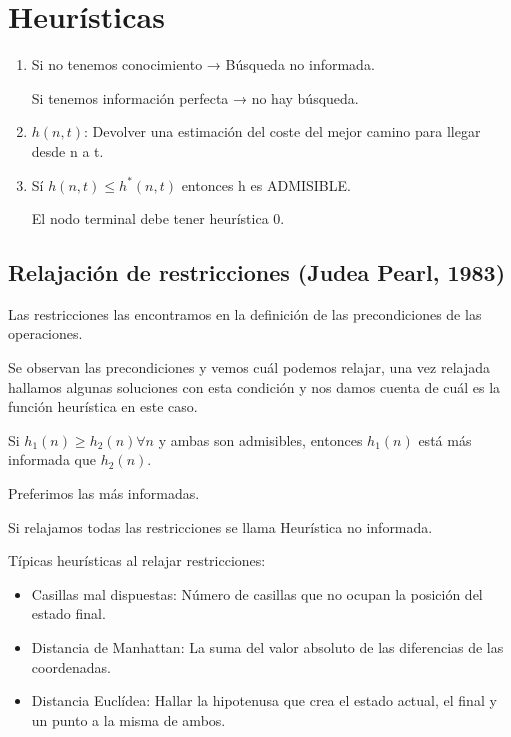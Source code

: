 \documentclass[12pt, twoside, openright]{report} %
\begin{document}
	
\section{Heurísticas}

  \begin{enumerate}
  \def\labelenumi{\arabic{enumi}.}
  \item
    Si no tenemos conocimiento → Búsqueda no informada.

    Si tenemos información perfecta → no hay búsqueda.
  \item
    \(h(n,t)\): Devolver una estimación del coste del mejor camino para
    llegar desde n a t.
  \item
    Sí \(h(n,t) \leq h^*(n,t)\) entonces h es ADMISIBLE.

    El nodo terminal debe tener heurística 0.
  \end{enumerate}

\subsection{Relajación de restricciones (Judea Pearl, 1983)}



    Las restricciones las encontramos en la definición de las
    precondiciones de las operaciones.

	Se observan las precondiciones y vemos cuál podemos relajar, una vez
    relajada hallamos algunas soluciones con esta condición y nos damos
    cuenta de cuál es la función heurística en este caso.

	Si \(h_1(n)\geq h_2(n) \forall n\) y ambas son admisibles, entonces
    \(h_1(n)\) está más informada que \(h_2(n)\).

    Preferimos las más informadas.

	Si relajamos todas las restricciones se llama Heurística no
    informada.

	Típicas heurísticas al relajar restricciones:

    \begin{itemize}
  
    \item
      Casillas mal dispuestas: Número de casillas que no ocupan la
      posición del estado final.
    \item
      Distancia de Manhattan: La suma del valor absoluto de las
      diferencias de las coordenadas.
    \item
      Distancia Euclídea: Hallar la hipotenusa que crea el estado
      actual, el final y un punto a la misma de ambos.
    \end{itemize}
\pagebreak
\end{document}
